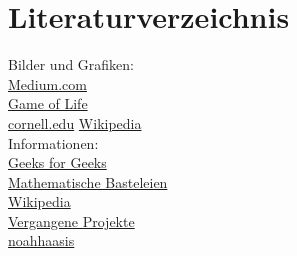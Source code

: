 \documentclass[11pt]{scrartcl}
\begin{document}
\section{Literaturverzeichnis}
Bilder und Grafiken:\\
\href{https://medium.com/tebs-lab/optimizing-conways-game-of-life-12f1b7f2f54c}{Medium.com}\\
\href{http://www.mathematische-basteleien.de/gameoflife.htm}{Game of Life}\\
\href{https://pi.math.cornell.edu/~lipa/mec/4life2.png}{cornell.edu}
\href{https://en.wikipedia.org/wiki/Conway\%27s_Game_of_Life}{Wikipedia}\\
Informationen:\\
\href{https://www.geeksforgeeks.org/program-for-conways-game-of-life/}{Geeks for Geeks}\\
\href{http://www.mathematische-basteleien.de/gameoflife.htm}{Mathematische Basteleien}\\
\href{https://en.wikipedia.org/wiki/Conway\%27s_Game_of_Life}{Wikipedia}\\
\href{https://gitlab.rz.htw-berlin.de/Lennard.Wittenberg/c-wise-lennard-wittenberg/}{Vergangene Projekte}\\
\href{https://github.com/noahhaasis/conwaysGameOfLife}{noahhaasis}
\end{document}

